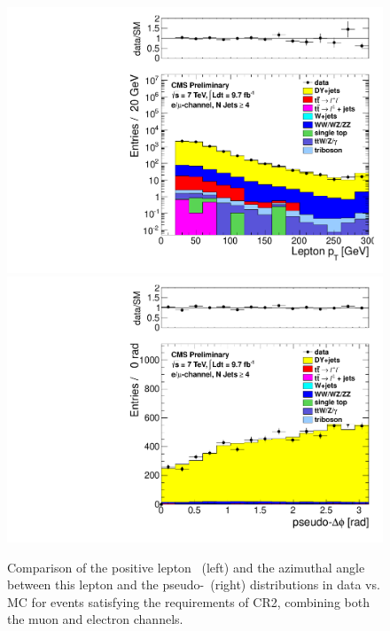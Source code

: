 \begin{figure}[hbt]
  \begin{center}
	\includegraphics[width=0.5\linewidth]{plots/CR2plots/leppt_scaled_nj4_emucomb.pdf}%
	\includegraphics[width=0.5\linewidth]{plots/CR2plots/dphi_metl_scaled_nj4_emucomb.pdf}
    \caption{
      Comparison of the positive lepton \pt\ (left) and the azimuthal angle between this lepton and the pseudo-\met\ (right) 
      distributions in data vs. MC for events satisfying the requirements of CR2, combining both the muon and
      electron channels. 
\label{fig:cr2lepptdphi} 
}  
      \end{center}
\end{figure}


